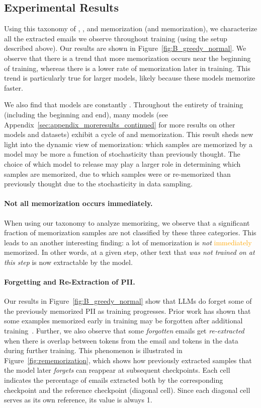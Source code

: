 \subsection{Experimental Results}
Using this taxonomy of \novel, \retained, and \forgotten memorization (and \assisted memorization), we characterize all the extracted emails we observe throughout training (using the setup described above). 
Our results are shown in Figure~\ref{fig:B_greedy_normal}. We observe that there is a trend that more \novel memorization occurs near the beginning of training, whereas there is a lower rate of \novel memorization later in training.
This trend is particularly true for larger models, likely because these models memorize faster.

We also find that models are constantly \forgetting. Throughout the entirety of training (including the beginning and end), many models (see Appendix~\ref{sec:appendix_moreresults_continued} for more results on other models and datasets) exhibit a cycle of \forgetting and \novel memorization. This result sheds new light into the dynamic view of memorization: which samples are memorized by a model may be more a function of stochasticity than previously thought. The choice of which model to release may play a larger role in determining which samples are memorized, due to which samples were \forgotten or re-memorized than previously thought due to the stochasticity in data sampling.

\paragraph{Not all memorization occurs immediately.} When using our taxonomy to analyze memorizing, we observe that a significant fraction of memorization samples are not classified by these three categories. This leads to an another interesting finding: a lot of memorization is \emph{not} \textcolor{orange}{immediately} memorized.
In other words, at a given step, other text that \emph{was not trained on at this step} is now extractable by the model. %

\paragraph{Forgetting and Re-Extraction of PII.}
Our results in Figure~\ref{fig:B_greedy_normal} show that LLMs do forget some of the previously memorized PII as training progresses. 
Prior work has shown that some examples memorized early in training may be forgotten after additional training~\citep{jagielski2022measuring}. 
Further, we also observe that some \emph{forgotten} emails get \emph{re-extracted} when there is \ngram overlap between tokens from the email and tokens in the data during further training. This phenomenon is illustrated in Figure~\ref{fig:rememorization}, which shows how previously extracted samples that the model later \emph{forgets} can reappear at subsequent checkpoints. Each cell indicates the percentage of emails extracted both by the corresponding checkpoint and the reference checkpoint (diagonal cell). Since each diagonal cell serves as its own reference, its value is always 1. 

